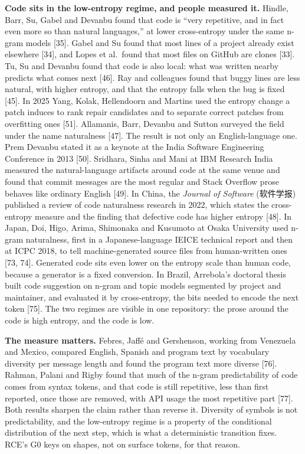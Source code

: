 \documentclass[10pt,letterpaper]{article}
\begin{document}
\textbf{Code sits in the low-entropy regime, and people measured it.}
Hindle, Barr, Su, Gabel and Devanbu found that code is ``very
repetitive, and in fact even more so than natural languages,'' at lower
cross-entropy under the same n-gram models {[}35{]}. Gabel and Su found
that most lines of a project already exist elsewhere {[}34{]}, and Lopes
et al.~found that most files on GitHub are clones {[}33{]}. Tu, Su and
Devanbu found that code is also local: what was written nearby predicts
what comes next {[}46{]}. Ray and colleagues found that buggy lines are
less natural, with higher entropy, and that the entropy falls when the
bug is fixed {[}45{]}. In 2025 Yang, Kolak, Hellendoorn and Martins used
the entropy change a patch induces to rank repair candidates and to
separate correct patches from overfitting ones {[}51{]}. Allamanis,
Barr, Devanbu and Sutton surveyed the field under the name naturalness
{[}47{]}. The result is not only an English-language one. Prem Devanbu
stated it as a keynote at the India Software Engineering Conference in
2013 {[}50{]}. Sridhara, Sinha and Mani at IBM Research India measured
the natural-language artifacts around code at the same venue and found
that commit messages are the most regular and Stack Overflow prose
behaves like ordinary English {[}49{]}. In China, the \emph{Journal of
Software} (软件学报) published a review of code naturalness research in
2022, which states the cross-entropy measure and the finding that
defective code has higher entropy {[}48{]}. In Japan, Doi, Higo, Arima,
Shimonaka and Kusumoto at Osaka University used n-gram naturalness,
first in a Japanese-language IEICE technical report and then at ICPC
2018, to tell machine-generated source files from human-written ones
{[}73, 74{]}. Generated code sits even lower on the entropy scale than
human code, because a generator is a fixed conversion. In Brazil,
Arrebola's doctoral thesis built code suggestion on n-gram and topic
models segmented by project and maintainer, and evaluated it by
cross-entropy, the bits needed to encode the next token {[}75{]}. The
two regimes are visible in one repository: the prose around the code is
high entropy, and the code is low.

\textbf{The measure matters.} Febres, Jaffé and Gershenson, working from
Venezuela and Mexico, compared English, Spanish and program text by
vocabulary diversity per message length and found the program text more
diverse {[}76{]}. Rahman, Palani and Rigby found that much of the n-gram
predictability of code comes from syntax tokens, and that code is still
repetitive, less than first reported, once those are removed, with API
usage the most repetitive part {[}77{]}. Both results sharpen the claim
rather than reverse it. Diversity of symbols is not predictability, and
the low-entropy regime is a property of the conditional distribution of
the next step, which is what a deterministic transition fixes. RCE's G0
keys on shapes, not on surface tokens, for that reason.
\end{document}
